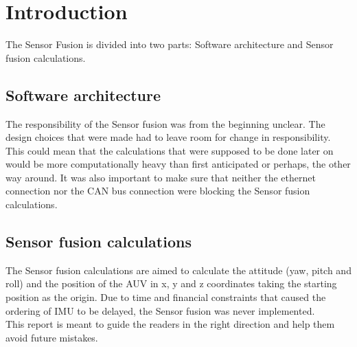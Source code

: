 
\section{Introduction}\label{sec:introduction}
The Sensor Fusion is divided into two parts: Software architecture and Sensor fusion calculations.

\subsection{Software architecture}
The responsibility of the Sensor fusion was from the beginning unclear. The design
choices that were made had to leave room for change in responsibility.
This could mean that the calculations that were supposed to be done later on would be 
more computationally heavy than first anticipated or perhaps, the other way around.
It was also important to make sure that neither the ethernet connection nor the CAN bus
connection were blocking the Sensor fusion calculations.

\subsection{Sensor fusion calculations}
The Sensor fusion calculations are aimed to calculate the attitude
(yaw, pitch and roll) and the position of the AUV in x, y and z
coordinates taking the starting position as the origin. Due to time and financial 
constraints that caused the ordering of IMU to be delayed, the Sensor fusion was never implemented. \\
This report
is meant to guide the readers in the right direction and help them avoid
future mistakes.
